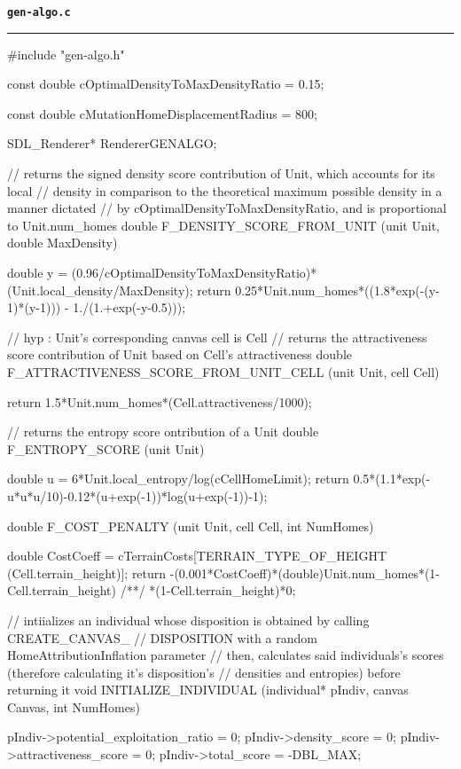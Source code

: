 \vspace*{5mm}
{\Large \texttt{\textbf{gen-algo.c}}}
\vspace*{1mm}
\hrule
\begin{C}
#include "gen-algo.h"

const double cOptimalDensityToMaxDensityRatio = 0.15;

const double cMutationHomeDisplacementRadius = 800;

SDL_Renderer* RendererGENALGO;


// returns the signed density score contribution of Unit, which accounts for its local
// density in comparison to the theoretical maximum possible density in a manner dictated
// by cOptimalDensityToMaxDensityRatio, and is proportional to Unit.num_homes
double F_DENSITY_SCORE_FROM_UNIT (unit Unit, double MaxDensity){
	
	double y = (0.96/cOptimalDensityToMaxDensityRatio)*(Unit.local_density/MaxDensity);
	return 0.25*Unit.num_homes*((1.8*exp(-(y-1)*(y-1))) - 1./(1.+exp(-y-0.5)));
}

// hyp : Unit's corresponding canvas cell is Cell
// returns the attractiveness score contribution of Unit based on Cell's attractiveness
double F_ATTRACTIVENESS_SCORE_FROM_UNIT_CELL (unit Unit, cell Cell){
	
	return 1.5*Unit.num_homes*(Cell.attractiveness/1000);
}


// returns the entropy score ontribution of a Unit
double F_ENTROPY_SCORE (unit Unit){
	
	double u = 6*Unit.local_entropy/log(cCellHomeLimit);
	return 0.5*(1.1*exp(-u*u*u/10)-0.12*(u+exp(-1))*log(u+exp(-1))-1);
}


double F_COST_PENALTY (unit Unit, cell Cell, int NumHomes){
	
	double CostCoeff = cTerrainCosts[TERRAIN_TYPE_OF_HEIGHT (Cell.terrain_height)];
	return -(0.001*CostCoeff)*(double)Unit.num_homes*(1-Cell.terrain_height)
	/**/ *(1-Cell.terrain_height)*0;
}


// intiializes an individual whose disposition is obtained by calling CREATE_CANVAS_
// DISPOSITION with a random HomeAttributionInflation parameter
// then, calculates said individuals's scores (therefore calculating it's disposition's
// densities and entropies) before returning it 
void INITIALIZE_INDIVIDUAL (individual* pIndiv, canvas Canvas, int NumHomes){
	
	pIndiv->potential_exploitation_ratio = 0;
	pIndiv->density_score = 0;
	pIndiv->attractiveness_score = 0;
	pIndiv->total_score = -DBL_MAX;
	
}
\end{C}
